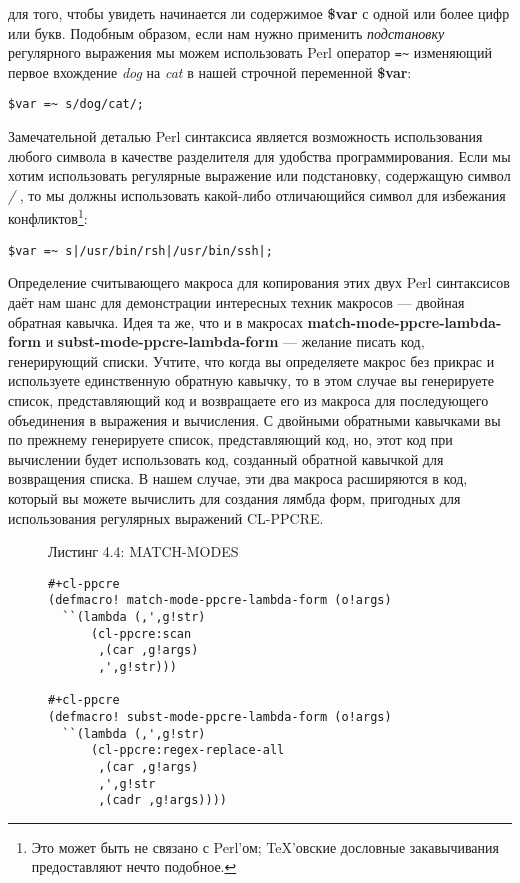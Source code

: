 для того, чтобы увидеть начинается ли содержимое \textbf{\$var} с одной или более цифр или букв. Подобным образом, если нам нужно применить \emph{подстановку} регулярного выражения мы можем использовать Perl оператор \verb"=~" изменяющий первое вхождение \emph{dog} на \emph{cat} в нашей строчной переменной \textbf{\$var}:

\begin{verbatim}
$var =~ s/dog/cat/;
\end{verbatim}

Замечательной деталью Perl синтаксиса является возможность использования любого символа в качестве разделителя для удобства программирования. Если мы хотим использовать регулярные выражение или подстановку, содержащую символ \emph{/} , то мы должны использовать какой-либо отличающийся символ для избежания конфликтов\footnote{Это может быть не связано с Perl'ом; \TeX'овские дословные закавычивания предоставляют нечто подобное.}:

\begin{verbatim}
$var =~ s|/usr/bin/rsh|/usr/bin/ssh|;
\end{verbatim}

Определение считывающего макроса для копирования этих двух Perl синтаксисов даёт нам шанс для демонстрации интересных техник макросов --- двойная обратная кавычка. Идея та же, что и в макросах \textbf{match-mode-ppcre-lambda-form} и \textbf{subst-mode-ppcre-lambda-form} --- желание писать код, генерирующий списки. Учтите, что когда вы определяете макрос без прикрас и используете единственную обратную кавычку, то в этом случае вы генерируете список, представляющий код и возвращаете его из макроса для последующего объединения в выражения и вычисления. С двойными обратными кавычками вы по прежнему генерируете список, представляющий код, но, этот код при вычислении будет использовать код, созданный обратной кавычкой для возвращения списка. В нашем случае, эти два макроса расширяются в код, который вы можете вычислить для создания лямбда форм, пригодных для использования регулярных выражений CL-PPCRE.

\begin{figure}Листинг 4.4: MATCH-MODES\label{listing_4.4}
\listbegin
\begin{verbatim}
#+cl-ppcre
(defmacro! match-mode-ppcre-lambda-form (o!args)
  ``(lambda (,',g!str)
      (cl-ppcre:scan
       ,(car ,g!args)
       ,',g!str)))

#+cl-ppcre
(defmacro! subst-mode-ppcre-lambda-form (o!args)
  ``(lambda (,',g!str)
      (cl-ppcre:regex-replace-all
       ,(car ,g!args)
       ,',g!str
       ,(cadr ,g!args))))
\end{verbatim}
\listend
\end{figure}

